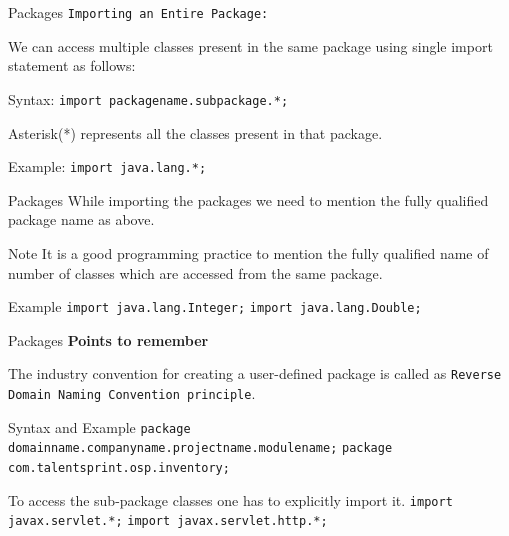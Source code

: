 \documentclass[14pt]{beamer}
\begin{document}
\begin{frame}{Packages}
 \texttt{Importing an Entire Package:}
 
 We can access multiple classes present in the same package using single import statement as follows: 
 \begin{block}{Syntax:}
 \lstinline!import packagename.subpackage.*;! 
 \end{block}
 Asterisk(*) represents all the classes present in that package.
 \begin{block}{Example:}
  \lstinline!import java.lang.*;!
 \end{block}
 \end{frame}
 
 \begin{frame}{Packages}
  While importing the packages we need to mention the fully qualified package name as above.
\begin{block}{Note}
 It is a good programming practice to mention the fully qualified name of number of classes which are  accessed from the same package. 
\end{block}
\begin{block}{Example}
 \lstinline!import java.lang.Integer;!
 \lstinline!import java.lang.Double;!
\end{block}
\end{frame}

\begin{frame}{Packages}
 \textbf{Points to remember}	
 
 The industry convention for creating a user-defined package is called as \texttt{Reverse Domain Naming Convention principle}.
 \begin{block}{Syntax and Example}
  \lstinline!package domainname.companyname.projectname.modulename;!
  \lstinline!package com.talentsprint.osp.inventory;!
 \end{block}
To access the sub-package classes one has to explicitly import it.
\lstinline!import javax.servlet.*;!
\lstinline!import javax.servlet.http.*;!
\end{frame}
\end{document}
